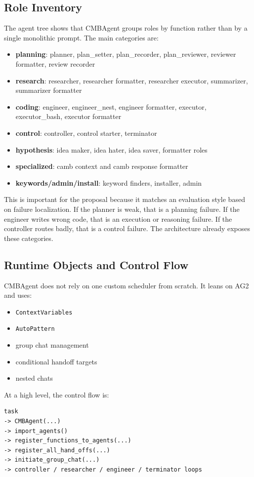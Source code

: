 \documentclass[11pt,a4paper]{article}
\begin{document}
\subsection{Role Inventory}
The agent tree shows that CMBAgent groups roles by function rather than by a
single monolithic prompt. The main categories are:
\begin{itemize}[leftmargin=1.5em]
\item \textbf{planning}: planner, plan\_setter, plan\_recorder, plan\_reviewer,
reviewer formatter, review recorder
\item \textbf{research}: researcher, researcher formatter, researcher executor,
summarizer, summarizer formatter
\item \textbf{coding}: engineer, engineer\_nest, engineer formatter, executor,
executor\_bash, executor formatter
\item \textbf{control}: controller, control starter, terminator
\item \textbf{hypothesis}: idea maker, idea hater, idea saver, formatter roles
\item \textbf{specialized}: camb context and camb response formatter
\item \textbf{keywords/admin/install}: keyword finders, installer, admin
\end{itemize}

This is important for the proposal because it matches an evaluation style based
on failure localization. If the planner is weak, that is a planning failure. If
the engineer writes wrong code, that is an execution or reasoning failure. If
the controller routes badly, that is a control failure. The architecture
already exposes these categories.

\subsection{Runtime Objects and Control Flow}
CMBAgent does not rely on one custom scheduler from scratch. It leans on AG2
and uses:
\begin{itemize}[leftmargin=1.5em]
\item \texttt{ContextVariables}
\item \texttt{AutoPattern}
\item group chat management
\item conditional handoff targets
\item nested chats
\end{itemize}

At a high level, the control flow is:
\begin{lstlisting}[style=plaincode]
task
-> CMBAgent(...)
-> import_agents()
-> register_functions_to_agents(...)
-> register_all_hand_offs(...)
-> initiate_group_chat(...)
-> controller / researcher / engineer / terminator loops
\end{lstlisting}
\end{document}
